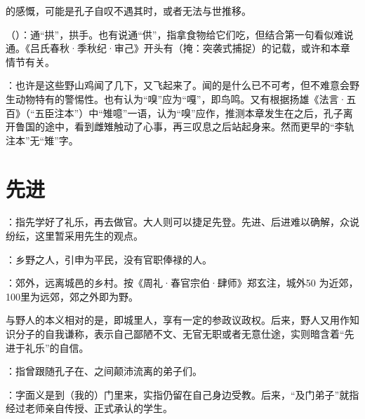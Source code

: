 {\item {}的感慨，可能是孔子自叹不遇其时，或者无法与世推移。
\item {}（）：通“拱”，拱手。也有说通“供”，指拿食物给它们吃，但结合第一句看似难说通。《吕氏春秋·季秋纪·审己》开头有（掩：突袭式捕捉）的记载，或许和本章情节有关。
\item {}：也许是这些野山鸡闻了几下，又飞起来了。闻的是什么已不可考，但不难意会野生动物特有的警惕性。也有认为“嗅”应为“嘎”，即鸟鸣。又有根据扬雄《法言·五百》（“五臣注本”）中“雉噫”一语，认为“嗅”应作，推测本章发生在之后，孔子离开鲁国的途中，看到雌雉触动了心事，再三叹息之后站起身来。然而更早的“李轨注本”无“雉”字。
}
{}



\chapter{先进}

{
\item {}：指先学好了礼乐，再去做官。大人则可以捷足先登。先进、后进难以确解，众说纷纭，这里暂采用先生的观点。

\item {}：乡野之人，引申为平民，没有官职俸禄的人。

：郊外，远离城邑的乡村。按《周礼·春官宗伯·肆师》郑玄注，城外50 为近郊，100里为远郊，郊之外即为野。

与野人的本义相对的是，即城里人，享有一定的参政议政权。后来，野人又用作知识分子的自我谦称，表示自己鄙陋不文、无官无职或者无意仕途，实则暗含着“先进于礼乐”的自信。
}
{}


{
\item {}：指曾跟随孔子在、之间颠沛流离的弟子们。%
\item {}：字面义是到（我的）门里来，实指仍留在自己身边受教。后来，“及门弟子”就指经过老师亲自传授、正式承认的学生。
}
{}


